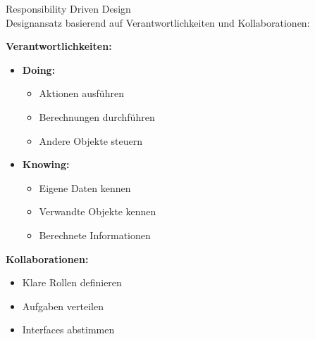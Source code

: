\begin{concept}{Responsibility Driven Design}\\
Designansatz basierend auf Verantwortlichkeiten und Kollaborationen:

\textbf{Verantwortlichkeiten:}
\begin{itemize}
    \item \textbf{Doing:}
    \begin{itemize}
        \item Aktionen ausführen
        \item Berechnungen durchführen
        \item Andere Objekte steuern
    \end{itemize}
    
    \item \textbf{Knowing:}
    \begin{itemize}
        \item Eigene Daten kennen
        \item Verwandte Objekte kennen
        \item Berechnete Informationen
    \end{itemize}
\end{itemize}

\textbf{Kollaborationen:}
\begin{itemize}
    \item Klare Rollen definieren
    \item Aufgaben verteilen
    \item Interfaces abstimmen
\end{itemize}
\end{concept}

